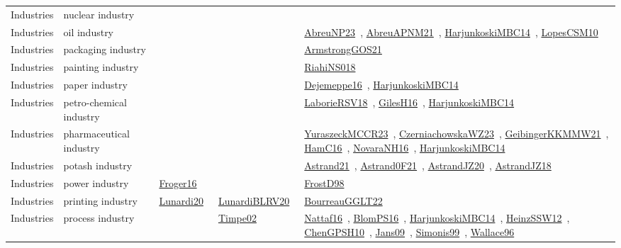 {\begin{longtable}{lp{3cm}>{\raggedright\arraybackslash}p{6cm}>{\raggedright\arraybackslash}p{6cm}>{\raggedright\arraybackslash}p{8cm}}
Industries & nuclear industry &  &  & \\
Industries & oil industry &  &  & \href{../works/AbreuNP23.pdf}{AbreuNP23}~\cite{AbreuNP23}, \href{../works/AbreuAPNM21.pdf}{AbreuAPNM21}~\cite{AbreuAPNM21}, \href{../works/HarjunkoskiMBC14.pdf}{HarjunkoskiMBC14}~\cite{HarjunkoskiMBC14}, \href{../works/LopesCSM10.pdf}{LopesCSM10}~\cite{LopesCSM10}\\
Industries & packaging industry &  &  & \href{../works/ArmstrongGOS21.pdf}{ArmstrongGOS21}~\cite{ArmstrongGOS21}\\
Industries & painting industry &  &  & \href{../works/RiahiNS018.pdf}{RiahiNS018}~\cite{RiahiNS018}\\
Industries & paper industry &  &  & \href{../works/Dejemeppe16.pdf}{Dejemeppe16}~\cite{Dejemeppe16}, \href{../works/HarjunkoskiMBC14.pdf}{HarjunkoskiMBC14}~\cite{HarjunkoskiMBC14}\\
Industries & petro-chemical industry &  &  & \href{../works/LaborieRSV18.pdf}{LaborieRSV18}~\cite{LaborieRSV18}, \href{../works/GilesH16.pdf}{GilesH16}~\cite{GilesH16}, \href{../works/HarjunkoskiMBC14.pdf}{HarjunkoskiMBC14}~\cite{HarjunkoskiMBC14}\\
Industries & pharmaceutical industry &  &  & \href{../works/YuraszeckMCCR23.pdf}{YuraszeckMCCR23}~\cite{YuraszeckMCCR23}, \href{../works/CzerniachowskaWZ23.pdf}{CzerniachowskaWZ23}~\cite{CzerniachowskaWZ23}, \href{../works/GeibingerKKMMW21.pdf}{GeibingerKKMMW21}~\cite{GeibingerKKMMW21}, \href{../works/HamC16.pdf}{HamC16}~\cite{HamC16}, \href{../works/NovaraNH16.pdf}{NovaraNH16}~\cite{NovaraNH16}, \href{../works/HarjunkoskiMBC14.pdf}{HarjunkoskiMBC14}~\cite{HarjunkoskiMBC14}\\
Industries & potash industry &  &  & \href{../works/Astrand21.pdf}{Astrand21}~\cite{Astrand21}, \href{../works/Astrand0F21.pdf}{Astrand0F21}~\cite{Astrand0F21}, \href{../works/AstrandJZ20.pdf}{AstrandJZ20}~\cite{AstrandJZ20}, \href{../works/AstrandJZ18.pdf}{AstrandJZ18}~\cite{AstrandJZ18}\\
Industries & power industry & \href{../works/Froger16.pdf}{Froger16}~\cite{Froger16} &  & \href{../works/FrostD98.pdf}{FrostD98}~\cite{FrostD98}\\
Industries & printing industry & \href{../works/Lunardi20.pdf}{Lunardi20}~\cite{Lunardi20} & \href{../works/LunardiBLRV20.pdf}{LunardiBLRV20}~\cite{LunardiBLRV20} & \href{../works/BourreauGGLT22.pdf}{BourreauGGLT22}~\cite{BourreauGGLT22}\\
Industries & process industry &  & \href{../works/Timpe02.pdf}{Timpe02}~\cite{Timpe02} & \href{../works/Nattaf16.pdf}{Nattaf16}~\cite{Nattaf16}, \href{../works/BlomPS16.pdf}{BlomPS16}~\cite{BlomPS16}, \href{../works/HarjunkoskiMBC14.pdf}{HarjunkoskiMBC14}~\cite{HarjunkoskiMBC14}, \href{../works/HeinzSSW12.pdf}{HeinzSSW12}~\cite{HeinzSSW12}, \href{../works/ChenGPSH10.pdf}{ChenGPSH10}~\cite{ChenGPSH10}, \href{../works/Jans09.pdf}{Jans09}~\cite{Jans09}, \href{../works/Simonis99.pdf}{Simonis99}~\cite{Simonis99}, \href{../works/Wallace96.pdf}{Wallace96}~\cite{Wallace96}\\

\end{longtable}}
